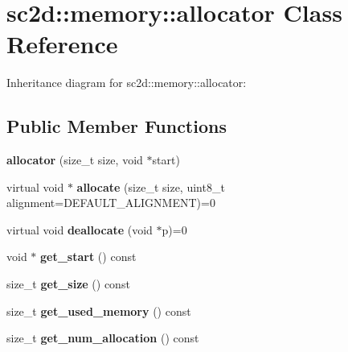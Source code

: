 \hypertarget{classsc2d_1_1memory_1_1allocator}{}\section{sc2d\+:\+:memory\+:\+:allocator Class Reference}
\label{classsc2d_1_1memory_1_1allocator}


Inheritance diagram for sc2d\+:\+:memory\+:\+:allocator\+:
\subsection*{Public Member Functions}
\begin{DoxyCompactItemize}
\item 
\mbox{\label{classsc2d_1_1memory_1_1allocator_a15fe77378d29ab41a1a44c596166b43a}} 
{\bfseries allocator} (size\+\_\+t size, void $\ast$start)
\item 
\mbox{\label{classsc2d_1_1memory_1_1allocator_afefebdf8439e35d7894829af8d653a51}} 
virtual void $\ast$ {\bfseries allocate} (size\+\_\+t size, uint8\+\_\+t alignment=D\+E\+F\+A\+U\+L\+T\+\_\+\+A\+L\+I\+G\+N\+M\+E\+NT)=0
\item 
\mbox{\label{classsc2d_1_1memory_1_1allocator_ab29524288541651d4bcacc278dc21deb}} 
virtual void {\bfseries deallocate} (void $\ast$p)=0
\item 
\mbox{\label{classsc2d_1_1memory_1_1allocator_a849ee42faf7430786e18eae6c5d67551}} 
void $\ast$ {\bfseries get\+\_\+start} () const
\item 
\mbox{\label{classsc2d_1_1memory_1_1allocator_a8265804fb4e665597c134cc96203e63a}} 
size\+\_\+t {\bfseries get\+\_\+size} () const
\item 
\mbox{\label{classsc2d_1_1memory_1_1allocator_a7bc5801c3b722c2339a1320028d4828d}} 
size\+\_\+t {\bfseries get\+\_\+used\+\_\+memory} () const
\item 
\mbox{\label{classsc2d_1_1memory_1_1allocator_ad519c09ef37afc903fbd83941697fc91}} 
size\+\_\+t {\bfseries get\+\_\+num\+\_\+allocation} () const
\end{DoxyCompactItemize}
